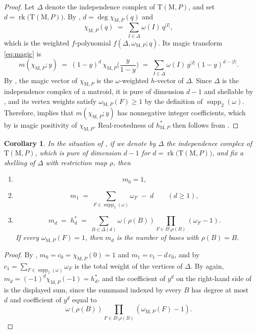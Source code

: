 \documentclass[11pt,a4paper,reqno]{amsart}
\theoremstyle{results}
\newtheorem{corollary}[thm]{Corollary}
\theoremstyle{definitions}
\newcommand{\abs}[1]{\left\lvert#1\right\rvert}
\newcommand{\rk}{\operatorname{rk}}
\newcommand{\M}{\mathrm{M}}
\DeclareMathOperator{\supp}{supp}
\newcommand{\hstar}{h^{*}}
\newcommand{\DT}{\mathrm{T}}      %
\begin{document}
\begin{proof}
  Let $\Delta$ denote the independence complex of $\DT(\M,P)$, and set
  $d = \rk\big(\DT(\M,P)\big)$.  By
  , $d = \deg \chi_{\M,P}(q)$ and 
  \[
    \chi_{\M,P}(q) \;=\; \sum_{I \in \Delta} \omega(I)\, q^{\abs{I}},
  \]
  which is the weighted $f$-polynomial $f(\Delta, \omega_{\M,P}; q)$.
  Its magic transform \eqref{eq:magic} is
  \[
    m(\chi_{\M,P}; y) \;=\; (1-y)^d\, \chi_{\M,P}\Big(\frac{y}{1-y}\Big)
      \;=\; \sum_{I \in \Delta} \omega(I)\, y^{\abs{I}} (1-y)^{d - \abs{I}}.
  \]
  By , the magic vector of $\chi_{\M,P}$ is the
  $\omega$-weighted $h$-vector of $\Delta$.
  Since $\Delta$ is the independence complex of a matroid, it is pure of dimension $d-1$ and shellable
  by , and its vertex weights satisfy $\omega_{\M, P}(F) \geqslant 1$ by the
  definition of $\supp_2(\omega)$.  Therefore,  implies that $m(\chi_{\M,P}; y)$
  has nonnegative integer coefficients, which by  is magic
  positivity of $\chi_{\M,P}$.  Real-rootedness of $\hstar_{\M,P}$ then follows
  from .
\end{proof}

\begin{corollary}\label{cor:magic-extremes}
  In the situation of , if we denote by $\Delta$ the independence
  complex of $\DT(\M,P)$, which is pure of dimension $d - 1$ for
  $d = \rk\big(\DT(\M,P)\big)$, and fix a shelling of $\Delta$ with restriction map
  $\rho$, then
  \begin{enumerate}[leftmargin=20pt]
    \item \[m_0 = 1,\]
    \item
    \[
    m_1 \;=\; \sum_{F \in \supp_2(\omega)} \omega_F \;-\; d\qquad(d\geqslant1),
    \]
    \item
    \[
    m_d \;=\; \hstar_d \;=\; \sum_{B \in \Delta(d)} \omega(\rho(B)) \prod_{F \in B \setminus \rho(B)} (\omega_F - 1).
    \]
    If every $\omega_{\M, P}(F) = 1$, then $m_d$ is the number of bases with $\rho(B) = B$.
  \end{enumerate}
\end{corollary}

\begin{proof}
  By , $m_0 = c_0 = \chi_{\M,P}(0) = 1$ and
  $m_1 = c_1 - d\,c_0$, and by 
  $c_1 = \sum_{F \in \supp_2(\omega)} \omega_F$
  is the total weight of the vertices of $\Delta$. By
   again, $m_d = (-1)^d \chi_{\M,P}(-1) = \hstar_d$, and the
  coefficient of $y^d$ on the right-hand side of  is the
  displayed sum, since the summand indexed by every $B$ has degree at most $d$ and coefficient of $y^d$ equal to 
  \[
  \omega(\rho(B))\prod_{F \in B \setminus \rho(B)}(\omega_{\M,P}(F) - 1).
  \]
\end{proof}
\end{document}
